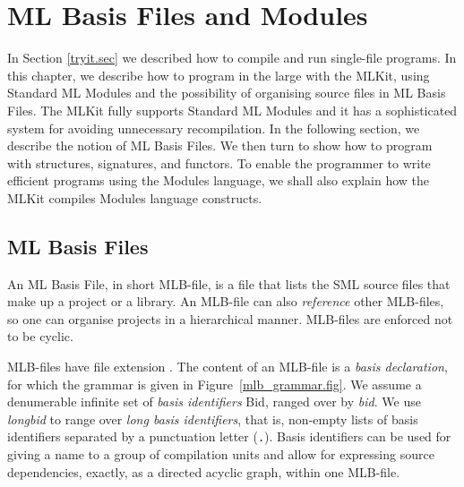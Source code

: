 \documentclass[12pt]{book}
\begin{document}
\chapter{ML Basis Files and Modules}
\label{mlb_and_modules.chap}
In Section \ref{tryit.sec} we described how to compile and run
single-file programs. In this chapter, we describe how to program in
the large with the MLKit, using
% 
Standard ML Modules and the possibility of organising source files
in ML Basis Files. The MLKit fully supports Standard ML Modules and it
has a sophisticated system for avoiding unnecessary recompilation. In
the following section, we describe the notion of ML Basis Files. We then
turn to show how to program with structures, signatures, and functors.
To enable the programmer to write efficient programs using the Modules
language, we shall also explain how the MLKit compiles Modules language
constructs.

\section{ML Basis Files}
An ML Basis File, in short MLB-file,  
%
%
is a file that lists the SML source files
that make up a project or a library. An MLB-file can also 
%
\emph{reference} other MLB-files, so one can organise projects in a
hierarchical manner. MLB-files are enforced not to be cyclic.

MLB-files have file extension .
The content of an MLB-file is a \emph{basis declaration}, for which
the 
%
grammar is given in Figure~\ref{mlb_grammar.fig}. We assume a
denumerable infinite set of \emph{basis identifiers} Bid, ranged over
by \emph{bid}. We use \emph{longbid} to range over \emph{long basis
  identifiers}, that is, non-empty lists of basis identifiers
separated by a punctuation letter (\texttt{.}). Basis identifiers can
be used for giving a name to a group of compilation units and allow
for expressing source dependencies, exactly, as a directed acyclic
graph, within one MLB-file.
\end{document}

